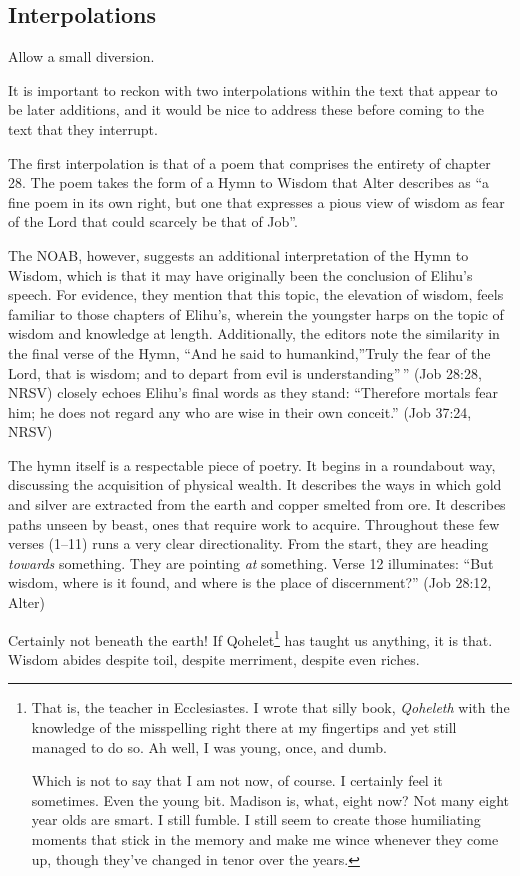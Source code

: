 \hypertarget{interpolations}{%
\subsection*{Interpolations}\label{interpolations}}

Allow a small diversion.

It is important to reckon with two interpolations within the text that appear to be later additions, and it would be nice to address these before coming to the text that they interrupt.

The first interpolation is that of a poem that comprises the entirety of chapter 28. The poem takes the form of a Hymn to Wisdom that Alter describes as ``a fine poem in its own right, but one that expresses a pious view of wisdom as fear of the Lord that could scarcely be that of Job''. \parencite[458]{alter}

The NOAB, however, suggests an additional interpretation of the Hymn to Wisdom, which is that it may have originally been the conclusion of Elihu's speech. For evidence, they mention that this topic, the elevation of wisdom, feels familiar to those chapters of Elihu's, wherein the youngster harps on the topic of wisdom and knowledge at length. Additionally, the editors note the similarity in the final verse of the Hymn, ``And he said to humankind,''Truly the fear of the Lord, that is wisdom; and to depart from evil is understanding''\,'' (Job 28:28, NRSV) closely echoes Elihu's final words as they stand: ``Therefore mortals fear him; he does not regard any who are wise in their own conceit.'' (Job 37:24, NRSV)

The hymn itself is a respectable piece of poetry. It begins in a roundabout way, discussing the acquisition of physical wealth. It describes the ways in which gold and silver are extracted from the earth and copper smelted from ore. It describes paths unseen by beast, ones that require work to acquire. Throughout these few verses (1--11) runs a very clear directionality. From the start, they are heading \emph{towards} something. They are pointing \emph{at} something. Verse 12 illuminates: ``But wisdom, where is it found, and where is the place of discernment?'' (Job 28:12, Alter)

Certainly not beneath the earth! If Qohelet\footnote{That is, the teacher in Ecclesiastes. I wrote that silly book, \emph{Qoheleth} with the knowledge of the misspelling right there at my fingertips and yet still managed to do so. Ah well, I was young, once, and dumb.

  Which is not to say that I am not now, of course. I certainly feel it sometimes. Even the young bit. Madison is, what, eight now? Not many eight year olds are smart. I still fumble. I still seem to create those humiliating moments that stick in the memory and make me wince whenever they come up, though they've changed in tenor over the years.} has taught us anything, it is that. Wisdom abides despite toil, despite merriment, despite even riches.

